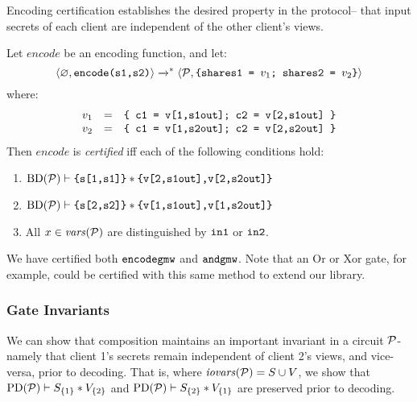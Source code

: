 Encoding certification establishes the desired property in the protocol-- that
input secrets of each client are independent of the other client's views. 
\begin{definition}
  \label{definition-gmwencode-certification}
  Let $\mathit{encode}$ be an encoding function, and let:
  $$
  \langle \varnothing,\texttt{encode(s1,s2)} \rangle \xrightarrow{}^{*}
  \langle \mathcal{P},\texttt{\{shares1 = }v_1\texttt{; shares2 = }v_2\texttt{\}} \rangle
  $$
  where:
  $$
  \begin{array}{rcl}
    v_1 &=& \texttt{\{ c1 = v[1,s1out]; c2 = v[2,s1out] \}}\\
    v_2 &=& \texttt{\{ c1 = v[1,s2out]; c2 = v[2,s2out] \}}
  \end{array}
  $$
  Then $\mathit{encode}$ is \emph{certified} iff each of the following conditions hold:
  \begin{enumerate}[\hspace{5mm}i.]
  \item $\mathrm{BD}(\mathcal{P}) \vdash \texttt{\{s[1,s1]\}} * \texttt{\{v[2,s1out],v[2,s2out]\}}$
  \item $\mathrm{BD}(\mathcal{P}) \vdash \texttt{\{s[2,s2]\}} * \texttt{\{v[1,s1out],v[1,s2out]\}}$
  \item All $x \in \mathit{vars}(\mathcal{P})$ are distinguished by $\texttt{in1}$ or $\texttt{in2}$. 
  \end{enumerate}
  \end{definition}

We have certified both $\texttt{encodegmw}$ and $\texttt{andgmw}$. Note that
an Or or Xor gate, for example, could be certified with this same
method to extend our library.

\subsubsection{Gate Invariants} We can show that composition maintains an
important invariant in a circuit $\mathcal{P}$- namely that client 1's
secrets remain independent of client 2's views, and vice-versa, prior
to decoding.  That is, where $\mathit{iovars}(\mathcal{P}) = S \cup V$, we show that
$\mathrm{PD}(\mathcal{P}) \vdash S_{\{1\}} * V_{\{2\}}$ and
$\mathrm{PD}(\mathcal{P}) \vdash S_{\{2\}} * V_{\{1\}}$ are preserved prior to
decoding.

